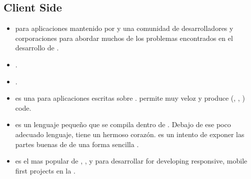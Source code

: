 \subsection{Client Side}
\begin{itemize}
	\item \textbf{\angularjs} \framework \opensource para aplicaciones \web mantenido por \google y una comunidad de desarrolladores y corporaciones para abordar muchos de los problemas encontrados en el desarrollo de \singlePageApp\cite{technology_angularjs}.
	\item \textbf{\emberjs}\cite{online_technology_emberjs}.
	\item \textbf{\backbonejs}\cite{online_technology_backbone}.
	
	\item \textbf{\meteor} es una \framework  \opensource \realtime para aplicaciones \web \javascript escritas sobre \nodejs \cite{online_meteor_documentation}. \meteor permite \prototyping muy veloz \cite{online_meteor_documentation_why} y produce \crossPlatform (\web, \android, \ios) code\cite{online_meteor_cross_platform}.
	
	\item \textbf{\coffeescript} es un lenguaje pequeño que se compila dentro de \javascript. Debajo de ese poco adecuado lenguaje, \javascript tiene un hermoso corazón. \coffeescript es un intento de exponer las partes buenas de \javascript de una forma sencilla \cite{technology_coffeescript}.
	
	
	
	\item \textbf{\bootstrap} es el \framework mas popular de \html, \css, y \javascript para desarrollar  for developing responsive, mobile first projects en la \web \cite{technology_bootstrap}.
\end{itemize}

